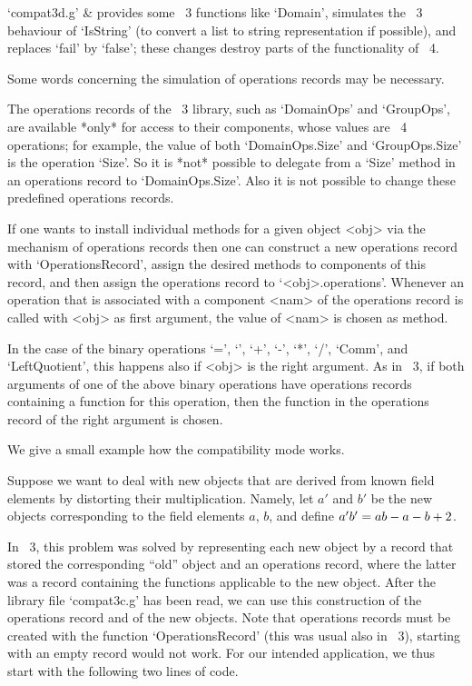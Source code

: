 \beginitems
`compat3d.g' &
    provides some {\GAP}~3 functions like `Domain', simulates the
    {\GAP}~3 behaviour of `IsString' (to convert a list to string
    representation if possible), and replaces `fail' by `false';
    these changes destroy parts of the functionality of {\GAP}~4.
\enditems

Some words concerning the simulation of operations records may be
necessary.

The operations records of the {\GAP}~3 library, such as `DomainOps'
and `GroupOps', are available *only* for access to their components,
whose values are {\GAP}~4 operations; for example, the value of both
`DomainOps.Size' and `GroupOps.Size' is the operation `Size'.
So it is *not* possible to delegate from a `Size' method in an
operations record to `DomainOps.Size'.
Also it is not possible to change these predefined operations records.

If one wants to install individual methods for a given object <obj>
via the mechanism of operations records then one can construct a new
operations record with `OperationsRecord', assign the desired methods
to components of this record, and then assign the operations record
to `<obj>.operations'.
Whenever an operation that is associated with a component <nam> of the
operations record is called with <obj> as first argument,
the value of <nam> is chosen as method.

In the case of the binary operations `=', `\<', `+', `-', `*', `/',
`Comm', and `LeftQuotient',
this happens also if <obj> is the right argument.
As in {\GAP}~3, if both arguments of one of the above binary operations
have operations records containing a function for this operation,
then the function in the operations record of the right argument
is chosen.

We give a small example how the compatibility mode works.

Suppose we want to deal with new objects that are derived from known
field elements by distorting their multiplication.
Namely, let $a'$ and $b'$ be the new objects corresponding to
the field elements $a$, $b$, and define $a' \* b' = a b - a - b + 2$.

In {\GAP}~3, this problem was solved by representing each new object
by a record that stored the corresponding ``old'' object and an
operations record, where the latter was a record containing the
functions applicable to the new object.
After the library file `compat3c.g' has been read,
we can use this construction of the operations record
and of the new objects.
Note that operations records must be created with the function
`OperationsRecord' (this was usual also in {\GAP}~3),
starting with an empty record would not work.
For our intended application,
we thus start with the following two lines of code.

